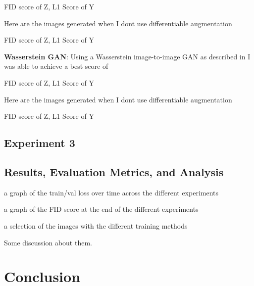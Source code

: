 \documentclass{UoYCSproject}
\begin{document}

FID score of Z, L1 Score of Y

Here are the images generated when I dont use differentiable augmentation

FID score of Z, L1 Score of Y

\textbf{Wasserstein GAN}: Using a Wasserstein image-to-image GAN as described in \cite{pix2pixwasserstein} I was able to achieve a best score of

FID score of Z, L1 Score of Y

Here are the images generated when I dont use differentiable augmentation

FID score of Z, L1 Score of Y

\section{Experiment 3}



\section{Results, Evaluation Metrics, and Analysis}

a graph of the train/val loss over time across the different experiments


a graph of the FID score at the end of the different experiments


a selection of the images with the different training methods


Some discussion about them.


\newpage{}

\chapter{Conclusion}


\newpage{}

\printbibliography
\end{document}
